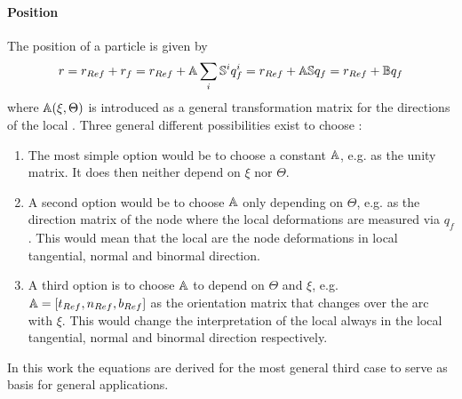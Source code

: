 \paragraph{Position} The position of a particle is given by
%
\begin{align}
  \label{eq:PositionInGeneral}
  r = r _{Ref} + r _{f} = r _{Ref} + \mathbb{A} \sum _{i} \mathbb{S}^i q_{f }^i = r _{Ref} + \mathbb{A} \mathbb{S} q_{f } = r _{Ref} + \mathbb{B} q_{f }
\end{align}
%
where $\mathbb{A}(\xi, \Theta)$ is introduced as a general transformation matrix for the directions of the local \dofs.
Three general different possibilities exist to choose \msA:
\begin{enumerate}
  \item The most simple option would be to choose a constant $\mathbb{A}$, e.g. as the unity matrix. 
  It does then neither depend on $\xi$ nor $\Theta$.
  \item A second option would be to choose $\mathbb{A}$ only depending on $\Theta$, e.g. as the direction matrix of the node where the local deformations are measured via $q_f$.
  This would mean that the local \dofs are the node deformations in local tangential, normal and binormal direction.
  \item A third option is to choose $\mathbb{A}$ to depend on $\Theta$ and $\xi$, e.g. $\mathbb{A} = \left[t _{Ref} , n _{Ref} , b _{Ref} \right]$ as the orientation matrix that changes over the arc with $\xi$.
  This would change the interpretation of the local \dofs always in the local tangential, normal and binormal direction respectively.
\end{enumerate}

In this work the equations are derived for the most general third case to serve as basis for general applications.\par

